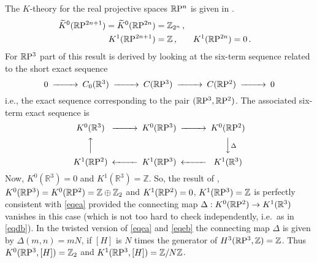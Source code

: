 \documentclass[a4paper,reqno]{amsart}
\theoremstyle{plain}
\theoremstyle{definition}
\theoremstyle{remark}
\numberwithin{equation}{section}
\numberwithin{figure}{section}
\newcommand{\RR}{{\mathbb R}}
\newcommand{\ZZ}{{\mathbb Z}}
\newcommand{\RP}{\RR {\rm P}}
\newcommand{\<}{\langle}
\renewcommand{\>}{\rangle}
\begin{document}
The $K$-theory for the real projective spaces $\RP^n$ is given in
\cite[Prop. 2.7.7]{Ati}.
\begin{align}
\widetilde{K}^0(\RP^{2n+1}) = \widetilde{K}^0(\RP^{2n}) & =\ZZ_{2^n}\,,
& \nonumber \\
K^1(\RP^{2n+1}) & = \ZZ \,, & K^1(\RP^{2n}) & = 0 \,.
\end{align}
For $\RP^3$ part of this result is derived by looking
at the six-term sequence related to the short exact sequence
\begin{equation} \label{eqea}
\begin{CD}
0 @>>> C_0(\RR^3) @>>> C(\RP^3) @>>> C(\RP^2) @>>> 0
\end{CD}
\end{equation}
i.e., the exact sequence corresponding to the pair $(\RP^3,\RP^2)$.
The associated six-term exact sequence is
\begin{equation} \label{eqeb}
\begin{CD}
K^0(\RR^3) @>>> K^0(\RP^3) @>>>   K^0(\RP^2) \\
        @AAA      &            &      @VV\Delta V \\
K^1(\RP^2)   @<<< K^1(\RP^3) @<<<    K^1(\RR^3)
\end{CD}
\end{equation}
Now, $K^0(\RR^3)=0$ and $K^1(\RR^3)=\ZZ$.  So, the result of \cite{Ati},
$K^0(\RP^3)=K^0(\RP^2) = \ZZ \oplus \ZZ_2$ and $K^1(\RP^2)=0$,
$K^1(\RP^3)=\ZZ$
is perfectly consistent with \eqref{eqea} provided the connecting map
$\Delta : K^0(\RP^2) \to K^1(\RR^3)$ vanishes in this case (which is not
too hard to check independently, i.e.\ as in \eqref{eqdb}).
In the twisted version of \eqref{eqea} and \eqref{eqeb} the connecting
map $\Delta$ is given by $\Delta (m,n) = mN$, if $[H]$
is $N$ times the generator of $H^3(\RP^3,\ZZ)=\ZZ$.
Thus $K^0(\RP^3,[H]) = \ZZ_2$ and $K^1(\RP^3,[H]) = \ZZ/N\ZZ$.
\end{document}
